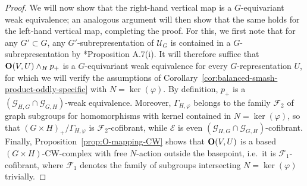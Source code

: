 \documentclass[reqno]{memo-l}
\theoremstyle{mythm}
\theoremstyle{definition}
\numberwithin{equation}{section}
\newcommand{\Ee}{{\mathcal{E}}}
\newcommand{\Ff}{{\mathcal{F}}}
\newcommand{\Uu}{{\mathcal{U}}}
\renewcommand{\phi}{\varphi}
\newcommand{\cat}[1]{\textbf{\textup{#1}}}
\let\smashp=\wedge
\begin{document}
\begin{proof}
    We will now show that the right-hand vertical map is a $G$-equivariant weak equivalence; an analogous argument will then show that the same holds for the left-hand vertical map, completing the proof. For this, we first note that for any $G'\subset G$, any $G'$-subrepresentation of $\Uu_G$ is contained in a $G$-subrepresentation by \cite{schwede_orbispaces_2020}*{Proposition A.7(i)}. It will therefore suffice that $\cat{O}(V,U)\smashp_H p_+$ is a $G$-equivariant weak equivalence for every $G$-representation $U$, for which we will verify the assumptions of Corollary~\ref{cor:balanced-smash-product-oddly-specific} with $N=\ker(\phi)$. By definition, $p_+$ is a $(\mathcal G_{H,G}\cap\mathcal G_{G,H})$-weak equivalence. Moreover, $\Gamma_{H,\phi}$ belongs to the family $\Ff_2$ of graph subgroups for homomorphisms with kernel contained in $N=\ker(\phi)$, so that $(G\times H)_+/\Gamma_{H,\phi}$ is $\Ff_2$-cofibrant, while $\Ee$ is even $(\mathcal G_{H,G}\cap\mathcal G_{G,H})$-cofibrant. Finally, Proposition~\ref{prop:O-mapping-CW} shows that $\cat{O}(V,U)$ is a based $(G\times H)$-CW-complex with free $N$-action outside the basepoint, i.e.\ it is $\Ff_1$-cofibrant, where $\Ff_1$ denotes the family of subgroups intersecting $N=\ker(\phi)$ trivially.
\end{proof}
\end{document}
